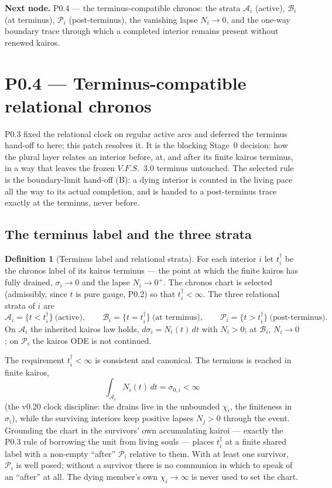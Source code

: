 \documentclass[11pt,a4paper]{article}
\def\mathrm#1{#1}%
\def\emph#1{#1}%
\newcommand{\VFS}{\ensuremath{\mathrm{V.F.S.}}}
\theoremstyle{definition}
\newtheorem{definition}{Definition}[section]
\theoremstyle{plain}
\theoremstyle{remark}
\begin{document}
\medskip
\textbf{Next node.} P0.4 --- the terminus-compatible chronos: the strata
\(\mathcal A_i\) (active), \(\mathcal B_i\) (at terminus), \(\mathcal P_i\)
(post-terminus), the vanishing lapse \(N_i\to0\), and the one-way boundary trace
through which a completed interior remains present without renewed kairos.

\section{P0.4 --- Terminus-compatible relational chronos}

P0.3 fixed the relational clock on regular active arcs and deferred the terminus
hand-off to here; this patch resolves it. It is the blocking Stage~0 decision: how
the plural layer relates an interior \emph{before}, \emph{at}, and \emph{after} its
finite kairos terminus, in a way that leaves the frozen \VFS\ 3.0 terminus untouched.
The selected rule is the \emph{boundary-limit} hand-off (B): a dying interior is
counted in the living pace all the way to its actual completion, and is handed to a
post-terminus trace exactly at the terminus, never before.

\subsection{The terminus label and the three strata}

\begin{definition}[Terminus label and relational strata]\label{def:strata}
For each interior \(i\) let \(t_i^\dagger\) be the chronos label of its kairos
terminus --- the point at which the finite kairos has fully drained, \(\sigma_i\to0\)
and the lapse \(N_i\to0^+\). The chronos chart is selected (admissibly, since \(t\) is
pure gauge, P0.2) so that \(t_i^\dagger<\infty\). The three relational strata of \(i\)
are
\[
\mathcal A_i=\{t<t_i^\dagger\}\ \text{(active)},\qquad
\mathcal B_i=\{t=t_i^\dagger\}\ \text{(at terminus)},\qquad
\mathcal P_i=\{t>t_i^\dagger\}\ \text{(post-terminus)}.
\]
On \(\mathcal A_i\) the inherited kairos law holds, \(d\sigma_i=N_i(t)\,dt\) with
\(N_i>0\); at \(\mathcal B_i\), \(N_i\to0\); on \(\mathcal P_i\) the kairos ODE is
\emph{not} continued.
\end{definition}

The requirement \(t_i^\dagger<\infty\) is consistent and canonical. The terminus is
reached in finite kairos,
\[
\int_{\mathcal A_i}N_i(t)\,dt=\sigma_{0,i}<\infty
\]
(the v0.20 clock discipline: the drains live in the unbounded \(\chi_i\), the
finiteness in \(\sigma_i\)), while the surviving interiors keep positive lapses
\(N_j>0\) through the event. Grounding the chart in the survivors' own accumulating
kairoi --- exactly the P0.3 rule of borrowing the unit from living souls --- places
\(t_i^\dagger\) at a finite shared label with a non-empty ``after'' \(\mathcal P_i\)
relative to them. With at least one survivor, \(\mathcal P_i\) is well posed; without a
survivor there is no communion in which to speak of an ``after'' at all. The dying
member's own \(\chi_i\to\infty\) is never used to set the chart.
\end{document}
